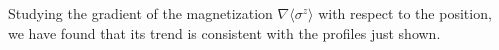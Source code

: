 Studying the gradient of the magnetization $\nabla \langle \sigma^z \rangle$ with respect to the position, we have found that its trend is consistent with the profiles just shown.






